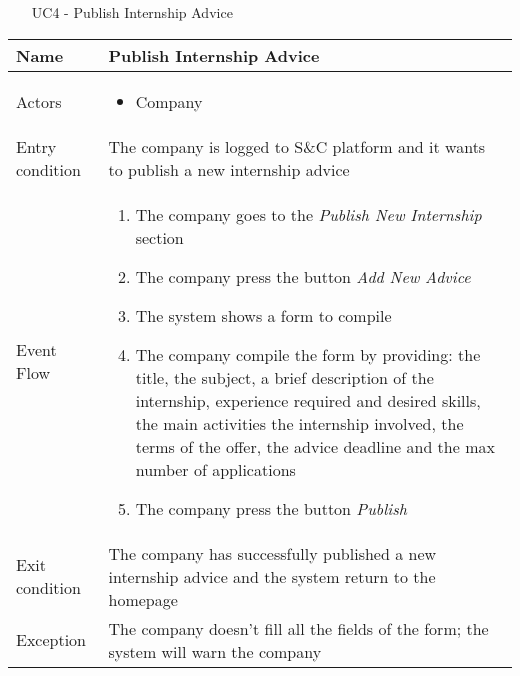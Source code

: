 			\begin{table} [H]
				\centering
					\begin{itemize}
					\item [UC4] - Publish Internship Advice
				\end{itemize}
				\begin{tabular}{|| P{7.5cm} | P{7.5cm} ||}
					\hline
					Name & Publish Internship Advice \\
					\hline
					Actors & \parbox{5cm}{\begin{itemize}
							\item Company
						\end{itemize}
					} \\
					\hline
					Entry condition & The company is logged to S\&C platform and it wants to publish a new internship advice \\
					\hline
					Event Flow & \parbox{5cm}{\begin{enumerate}
							\item The company goes to the \textit{Publish 
							New Internship} section
							\item The company press the button \textit{Add 
							New Advice} 
							\item The system shows a form to compile
							\item The company compile the form by 
							providing: the title, the subject, a 
							brief description of the internship, 
							experience required and desired 
							skills, the main activities the 
							internship involved, the terms of the 
							offer, the advice deadline and the 
							max number of applications
							\item The company press the button 
							\textit{Publish}
					\end{enumerate}} \\
					\hline 
					Exit condition & The company has successfully published a 
					new internship advice and the system 
					return to the homepage  \\
					\hline
					Exception & The company doesn't fill all the 
					fields of the form; the system will 
					warn the company \\
					\hline
				\end{tabular}
				\end{table}
				
				
				
